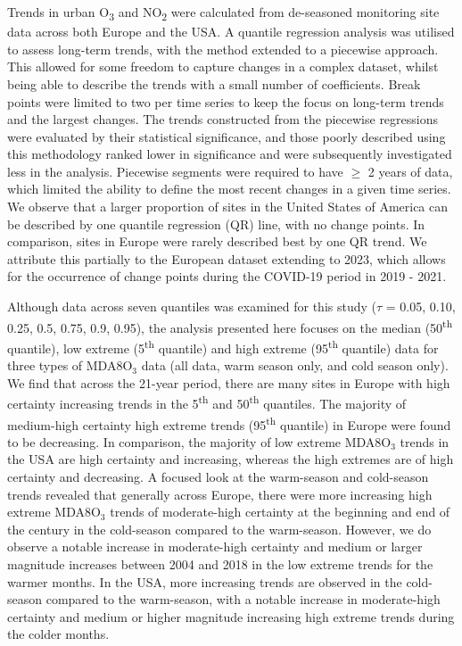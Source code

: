 \documentclass[journal abbreviation, manuscript]{copernicus}
\begin{document}
Trends in urban O\textsubscript{3} and NO\textsubscript{2} were calculated from de-seasoned monitoring site data across both Europe and the USA. A quantile regression analysis was utilised to assess long-term trends, with the method extended to a piecewise approach. This allowed for some freedom to capture changes in a complex dataset, whilst being able to describe the trends with a small number of coefficients. Break points were limited to two per time series to keep the focus on long-term trends and the largest changes. The trends constructed from the piecewise regressions were evaluated by their statistical significance, and those poorly described using this methodology ranked lower in significance and were subsequently investigated less in the analysis. Piecewise segments were required to have $\ge$ 2 years of data, which limited the ability to define the most recent changes in a given time series. We observe that a larger proportion of sites in the United States of America can be described by one quantile regression (QR) line, with no change points. In comparison, sites in Europe were rarely described best by one QR trend. We attribute this partially to the European dataset extending to 2023, which allows for the occurrence of change points during the COVID-19 period in 2019 - 2021. 

Although data across seven quantiles was examined for this study ($\tau$ = 0.05, 0.10, 0.25, 0.5, 0.75, 0.9, 0.95), the analysis presented here focuses on the median (50\textsuperscript{th} quantile), low extreme (5\textsuperscript{th} quantile) and high extreme (95\textsuperscript{th} quantile) data for three types of MDA8O$_3$ data (all data, warm season only, and cold season only). We find that across the 21-year period, there are many sites in Europe with high certainty increasing trends in the 5\textsuperscript{th} and 50\textsuperscript{th} quantiles. The majority of medium-high certainty high extreme trends (95\textsuperscript{th} quantile) in Europe were found to be decreasing. In comparison, the majority of low extreme MDA8O$_3$ trends in the USA are high certainty and increasing, whereas the high extremes are of high certainty and decreasing. A focused look at the warm-season and cold-season trends revealed that generally across Europe, there were more increasing high extreme MDA8O$_3$ trends of moderate-high certainty at the beginning and end of the century in the cold-season compared to the warm-season. However, we do observe a notable increase in moderate-high certainty and medium or larger magnitude increases between 2004 and 2018 in the low extreme trends for the warmer months. In the USA, more increasing trends are observed in the cold-season compared to the warm-season, with a notable increase in moderate-high certainty and medium or higher magnitude increasing high extreme trends during the colder months.
\end{document}

